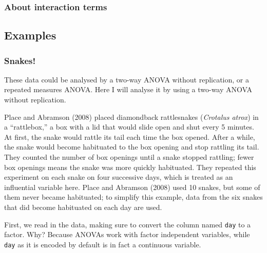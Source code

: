 \documentclass[english,10pt,a4paper,oneside]{book}
\newenvironment{Shaded}{\begin{snugshade}}{\end{snugshade}}
\newcommand{\KeywordTok}[1]{\textcolor[rgb]{0.13,0.29,0.53}{\textbf{#1}}}
\newcommand{\NormalTok}[1]{#1}
\newcommand{\OperatorTok}[1]{\textcolor[rgb]{0.81,0.36,0.00}{\textbf{#1}}}
\newcommand{\StringTok}[1]{\textcolor[rgb]{0.31,0.60,0.02}{#1}}
\theoremstyle{definition}
\theoremstyle{definition}
\theoremstyle{definition}
\theoremstyle{remark}
\begin{document}
\hypertarget{about-interaction-terms}{%
\subsubsection{About interaction terms}\label{about-interaction-terms}}

\hypertarget{examples}{%
\subsection{Examples}\label{examples}}

\hypertarget{snakes}{%
\subsubsection{Snakes!}\label{snakes}}

These data could be analysed by a two-way ANOVA without replication, or
a repeated measures ANOVA. Here I will analyse it by using a two-way
ANOVA without replication.

Place and Abramson (2008) placed diamondback rattlesnakes
(\emph{Crotalus atrox}) in a \enquote{rattlebox,} a box with a lid that
would slide open and shut every 5 minutes. At first, the snake would
rattle its tail each time the box opened. After a while, the snake would
become habituated to the box opening and stop rattling its tail. They
counted the number of box openings until a snake stopped rattling; fewer
box openings means the snake was more quickly habituated. They repeated
this experiment on each snake on four successive days, which is treated
as an influential variable here. Place and Abramson (2008) used 10
snakes, but some of them never became habituated; to simplify this
example, data from the six snakes that did become habituated on each day
are used.

First, we read in the data, making sure to convert the column named
\texttt{day} to a factor. Why? Because ANOVAs work with factor
independent variables, while \texttt{day} as it is encoded by default is
in fact a continuous variable.

\begin{Shaded}
\end{Shaded}
\end{document}
